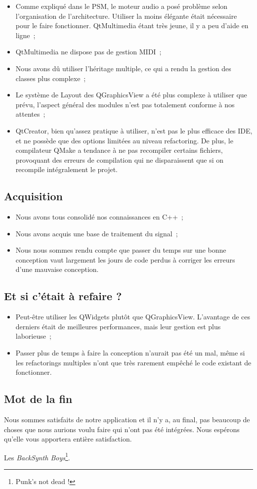 \begin{itemize}
\item
  Comme expliqué dans le PSM, le moteur audio a posé problème selon
  l'organisation de l'architecture. Utiliser la moins élégante était
  nécessaire pour le faire fonctionner. QtMultimedia étant très
  jeune, il y a peu d'aide en ligne~;
\item
  QtMultimedia ne dispose pas de gestion MIDI~;
\item
  Nous avons dû utiliser l'héritage multiple, ce qui a rendu la
  gestion des classes plus complexe~;
\item
  Le système de Layout des QGraphicsView a été plus complexe à
  utiliser que prévu, l'aspect général des modules n'est pas
  totalement conforme à nos attentes~;
\item
  QtCreator, bien qu'assez pratique à utiliser, n'est pas le plus
  efficace des IDE, et ne possède que des options limitées au niveau
  refactoring. De plus, le compilateur QMake a tendance à ne pas
  recompiler certains fichiers, provoquant des erreurs de compilation
  qui ne disparaissent que si on recompile intégralement le projet.
\end{itemize}

\subsection{Acquisition}

\begin{itemize}
\item
  Nous avons tous consolidé nos connaissances en C++~;
\item
  Nous avons acquis une base de traitement du signal~;
\item
  Nous nous sommes rendu compte que passer du temps sur une bonne
  conception vaut largement les jours de code perdus à corriger les
  erreurs d'une mauvaise conception.
\end{itemize}

\subsection{Et si c'était à refaire ?}

\begin{itemize}
\item
  Peut-être utiliser les QWidgets plutôt que QGraphicsView.
  L'avantage de ces derniers était de meilleures performances, mais
  leur gestion est plus laborieuse~;
\item
  Passer plus de temps à faire la conception n'aurait pas été un mal,
  même si les refactorings multiples n'ont que très rarement empêché
  le code existant de fonctionner.
\end{itemize}

\subsection{Mot de la fin}

Nous sommes satisfaits de notre application et il n'y a, au final,
pas beaucoup de choses que nous aurions voulu faire qui n'ont pas
été intégrées. Nous espérons qu'elle vous apportera entière
satisfaction.

Les \emph{BackSynth Boys}\footnote{Punk's not dead !}.

